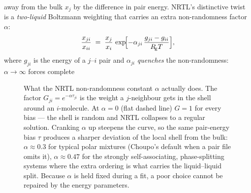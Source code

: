 \documentclass[11pt,a4paper]{article}
\newcommand{\Rgas}{R_{\!\mathrm{g}}}                %
\begin{document}
away from the bulk $x_j$ by the difference in pair energy. NRTL's
distinctive twist is a \emph{two-liquid} Boltzmann weighting that
carries an extra non-randomness factor $\alpha$:
\begin{equation}
   \frac{x_{ji}}{x_{ii}} \;=\;
   \frac{x_j}{x_i}\,
   \exp\!\Bigl[-\alpha_{ji}\,\frac{g_{ji}-g_{ii}}{\Rgas T}\Bigr],
   \label{eq:nrtl-local}
\end{equation}
where $g_{ji}$ is the energy of a $j$--$i$ pair and $\alpha_{ji}$
\emph{quenches} the non-randomness: $\alpha\to\infty$ forces complete

\begin{figure}[ht]\centering
{}
\caption{What the NRTL non-randomness constant $\alpha$ actually does.
The factor $G_{ji}=e^{-\alpha\tau_{ji}}$ is the weight a $j$-neighbour
gets in the shell around an $i$-molecule.  At $\alpha=0$ (flat dashed
line) $G=1$ for every bias --- the shell is random and NRTL collapses to
a regular solution.  Cranking $\alpha$ up steepens the curve, so the same
pair-energy bias $\tau$ produces a sharper deviation of the local shell
from the bulk: $\alpha\approx0.3$ for typical polar mixtures (Choupo's
default when a pair file omits it), $\alpha\approx0.47$ for the strongly
self-associating, phase-splitting systems where the extra ordering is
what carries the liquid--liquid split.  Because $\alpha$ is held fixed
during a fit, a poor choice cannot be repaired by the energy parameters.}
\label{fig:nrtl-alpha-ordering}
\end{figure}
\end{document}

